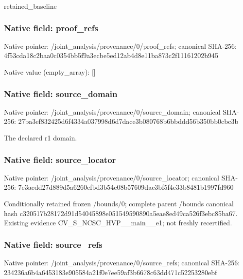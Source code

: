 \documentclass[10pt,a4paper]{article}
\begin{document}
\begingroup\raggedright\sloppy retained\_\allowbreak{}baseline\par\endgroup

\subsubsection{Native field: proof\_\allowbreak{}refs}
Native pointer: /joint\_\allowbreak{}analysis/provenance/0/proof\_\allowbreak{}refs; canonical SHA-256: 4f53cda18c2baa0c0354bb5f9a3ecbe5ed12ab4d8e11ba873c2f11161202b945

Native value (empty\_\allowbreak{}array): []

\subsubsection{Native field: source\_\allowbreak{}domain}
Native pointer: /joint\_\allowbreak{}analysis/provenance/0/source\_\allowbreak{}domain; canonical SHA-256: 27ba3ef832425d6f4334a037998d6d7dace3b080768b6bbddd56b350bb0cbc3b

\begingroup\raggedright\sloppy The declared r1 domain.\par\endgroup

\subsubsection{Native field: source\_\allowbreak{}locator}
Native pointer: /joint\_\allowbreak{}analysis/provenance/0/source\_\allowbreak{}locator; canonical SHA-256: 7e3aedd27d889d5a6260efbd3b54c08b57609dac3bf5f4e33b8481b1997fd960

\begingroup\raggedright\sloppy Conditionally retained frozen /\allowbreak{}bounds/\allowbreak{}0;\allowbreak{} complete parent /\allowbreak{}bounds canonical hash c320517b28172d91d54045898e051549590890a5eae8ed49ca526f3ebc85ba67. Existing evidence CV\_\allowbreak{}S\_\allowbreak{}NCSC\_\allowbreak{}HVP\_\allowbreak{}\_\allowbreak{}main\_\allowbreak{}\_\allowbreak{}e1;\allowbreak{} not freshly recertified.\par\endgroup

\subsubsection{Native field: source\_\allowbreak{}refs}
Native pointer: /joint\_\allowbreak{}analysis/provenance/0/source\_\allowbreak{}refs; canonical SHA-256: 234236a6b4a6453183e905584a21f0e7ee59af3b6678c63dd471c52253280ebf
\end{document}
